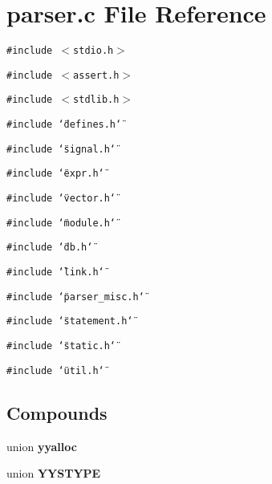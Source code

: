 \section{parser.c File Reference}
\label{parser_8c}
{\tt \#include $<$stdio.h$>$}\par
{\tt \#include $<$assert.h$>$}\par
{\tt \#include $<$stdlib.h$>$}\par
{\tt \#include \char`\"{}defines.h\char`\"{}}\par
{\tt \#include \char`\"{}signal.h\char`\"{}}\par
{\tt \#include \char`\"{}expr.h\char`\"{}}\par
{\tt \#include \char`\"{}vector.h\char`\"{}}\par
{\tt \#include \char`\"{}module.h\char`\"{}}\par
{\tt \#include \char`\"{}db.h\char`\"{}}\par
{\tt \#include \char`\"{}link.h\char`\"{}}\par
{\tt \#include \char`\"{}parser\_\-misc.h\char`\"{}}\par
{\tt \#include \char`\"{}statement.h\char`\"{}}\par
{\tt \#include \char`\"{}static.h\char`\"{}}\par
{\tt \#include \char`\"{}util.h\char`\"{}}\par
\subsection*{Compounds}
\begin{CompactItemize}
\item 
union {\bf yyalloc}
\item 
union {\bf YYSTYPE}
\end{CompactItemize}
